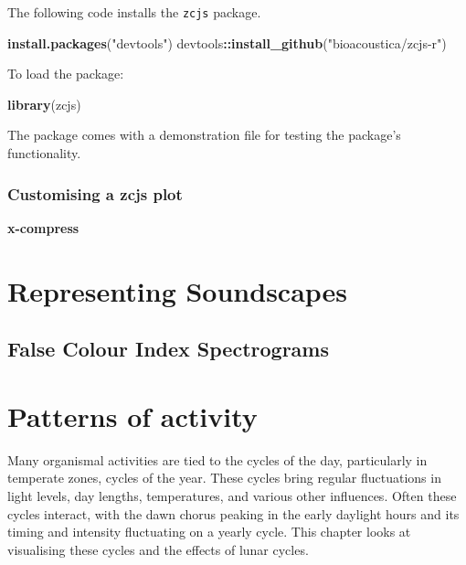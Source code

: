 \documentclass[
]{book}
\newenvironment{Shaded}{\begin{snugshade}}{\end{snugshade}}
\newcommand{\FunctionTok}[1]{\textcolor[rgb]{0.13,0.29,0.53}{\textbf{#1}}}
\newcommand{\NormalTok}[1]{#1}
\newcommand{\SpecialCharTok}[1]{\textcolor[rgb]{0.81,0.36,0.00}{\textbf{#1}}}
\newcommand{\StringTok}[1]{\textcolor[rgb]{0.31,0.60,0.02}{#1}}
\begin{document}
The following code installs the \texttt{zcjs} package.

\begin{Shaded}
\begin{Highlighting}[]
\FunctionTok{install.packages}\NormalTok{(}\StringTok{"devtools"}\NormalTok{)}
\NormalTok{devtools}\SpecialCharTok{::}\FunctionTok{install\_github}\NormalTok{(}\StringTok{"bioacoustica/zcjs{-}r"}\NormalTok{)}
\end{Highlighting}
\end{Shaded}

To load the package:

\begin{Shaded}
\begin{Highlighting}[]
\FunctionTok{library}\NormalTok{(zcjs)}
\end{Highlighting}
\end{Shaded}

The package comes with a demonstration file for testing the package's functionality.

\hypertarget{customising-a-zcjs-plot}{%
\subsection{Customising a zcjs plot}\label{customising-a-zcjs-plot}}

\textbf{x-compress}

\hypertarget{representing-soundscapes}{%
\chapter{Representing Soundscapes}\label{representing-soundscapes}}

\hypertarget{false-colour-index-spectrograms}{%
\section{False Colour Index Spectrograms}\label{false-colour-index-spectrograms}}

\hypertarget{patterns-of-activity}{%
\chapter{Patterns of activity}\label{patterns-of-activity}}

Many organismal activities are tied to the cycles of the day, particularly in temperate zones, cycles of the year. These cycles bring regular fluctuations in light levels, day lengths, temperatures, and various other influences. Often these cycles interact, with the dawn chorus peaking in the early daylight hours and its timing and intensity fluctuating on a yearly cycle. This chapter looks at visualising these cycles and the effects of lunar cycles.
\end{document}
